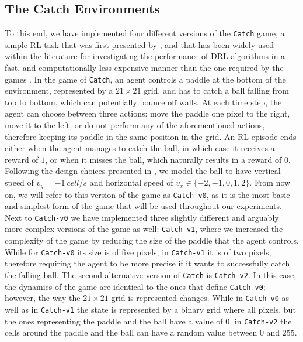 \subsection{The Catch Environments}
\label{sec:catch_environments}

To this end, we have implemented four different versions of the \texttt{Catch} game, a simple RL task that was first presented by \citet{mnih2014recurrent}, and that has been widely used within the literature for investigating the performance of DRL algorithms in a fast, and computationally less expensive manner than the one required by the  games \cite{vanjos2018deep, aittahar2020empirical}. In the game of \texttt{Catch}, an agent controls a paddle at the bottom of the environment, represented by a $21 \times 21$ grid, and has to catch a ball falling from top to bottom, which can potentially bounce off walls.
At each time step, the agent can choose between three actions: move the paddle one pixel to the right, move it to the left, or do not perform any of the aforementioned actions, therefore keeping its paddle in the same position in the grid. An RL episode ends either when the agent manages to catch the ball, in which case it receives a reward of $1$, or when it misses the ball, which naturally results in a reward of $0$. Following the design choices presented in \cite{vanjos2017deep}, we model the ball to have vertical speed of $v_y=-1 \: cell/s$ and horizontal speed of $v_x \in \{-2,-1,0,1,2\}$. From now on, we will refer to this version of the game as \texttt{Catch-v0}, as it is the most basic and simplest form of the game that will be used throughout our experiments. Next to \texttt{Catch-v0} we have implemented three slightly different and arguably more complex versions of the game as well: \texttt{Catch-v1}, where we increased the complexity of the game by reducing the size of the paddle that the agent controls. While for \texttt{Catch-v0} its size is of five pixels, in \texttt{Catch-v1} it is of two pixels, therefore requiring the agent to be more precise if it wants to successfully catch the falling ball. The second alternative version of \texttt{Catch} is \texttt{Catch-v2}. In this case, the dynamics of the game are identical to the ones that define \texttt{Catch-v0}; however, the way the $21 \times 21$ grid is represented changes. While in \texttt{Catch-v0} as well as in \texttt{Catch-v1} the state is represented by a binary grid where all pixels, but the ones representing the paddle and the ball have a value of $0$, in \texttt{Catch-v2} the cells around the paddle and the ball can have a random value between $0$ and $255$. 
